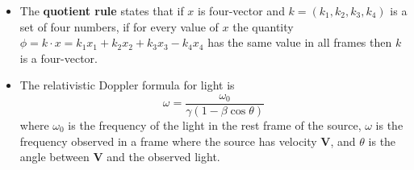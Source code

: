 \documentclass{article}
\renewcommand{\vec}[1]{\boldsymbol{\mathbf{#1}}}
\begin{document}
\begin{itemize}
  \item The \textbf{quotient rule} states that if $x$ is four-vector and $k = (k_1, k_2, k_3, k_4)$ is a set of four numbers, if for every value of $x$ the quantity $\phi = k \cdot x = k_1 x_1 + k_2 x_2 + k_3 x_3 - k_4 x_4$ has the same value in all frames then $k$ is a four-vector.

  \item The relativistic Doppler formula for light is \[\omega = \frac{\omega_0}{\gamma (1 - \beta \cos \theta)}\] where $\omega_0$ is the frequency of the light in the rest frame of the source, $\omega$ is the frequency observed in a frame where the source has velocity $\vec{V}$, and $\theta$ is the angle between $\vec{V}$ and the observed light.
\end{itemize}
\end{document}
